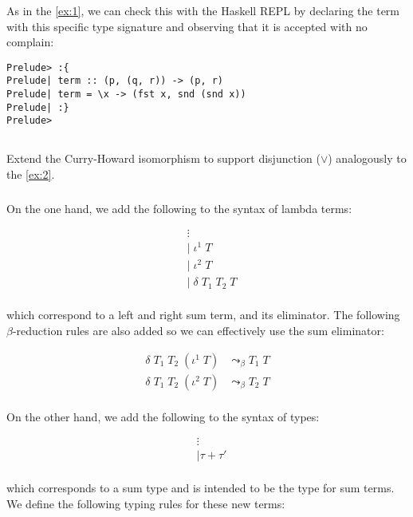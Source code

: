 \documentclass{article}
\begin{document}
As in the \ref{ex:1}, we can check this with the Haskell REPL 
by declaring the term with this specific type signature
and observing that it is accepted with no complain:

\begin{verbatim}
Prelude> :{
Prelude| term :: (p, (q, r)) -> (p, r)
Prelude| term = \x -> (fst x, snd (snd x))
Prelude| :}
Prelude>
\end{verbatim}

\subsection{}\label{ex:4}

Extend the Curry-Howard isomorphism to support disjunction
($\lor$) analogously to the \ref{ex:2}.

\subsubsection{}

On the one hand, we add the following to the syntax 
of lambda terms:

\begin{align*}
  &\vdots\\
  &|\;\iota^1\;T\\
  &|\;\iota^2\;T\\
  &|\;\delta\;T_1\;T_2\;T\\
\end{align*}

which correspond to a left and right sum term, 
and its eliminator. The following $\beta$-reduction 
rules are also added so we can effectively use the 
sum eliminator:

\begin{align*}
  \delta\;T_1\;T_2\;(\iota^1\;T) &\leadsto_\beta T_1\;T\\
  \delta\;T_1\;T_2\;(\iota^2\;T) &\leadsto_\beta T_2\;T\\
\end{align*}

On the other hand, we add the following to the syntax of types:

\begin{align*}
  &\vdots\\
  &|\tau + \tau'\\
\end{align*}

which corresponds to a sum type and is intended to be 
the type for sum terms. We define the 
following typing rules for these new terms:
\end{document}
